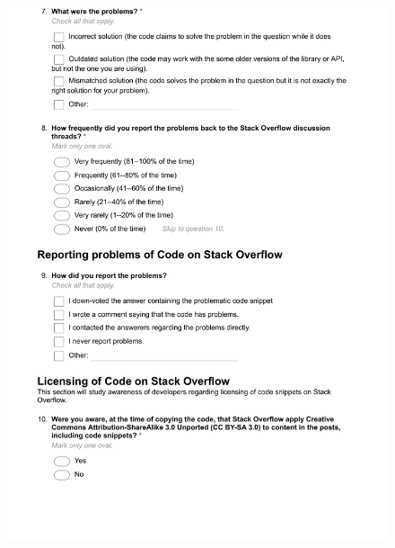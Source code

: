 \documentclass{svjour3}                     %
\begin{document}
\begin{figure}[H]
	\centering
	\includegraphics[width=0.9\linewidth]{visitor-3}
	\label{fig:visitor-3}
\end{figure}
\end{document}
